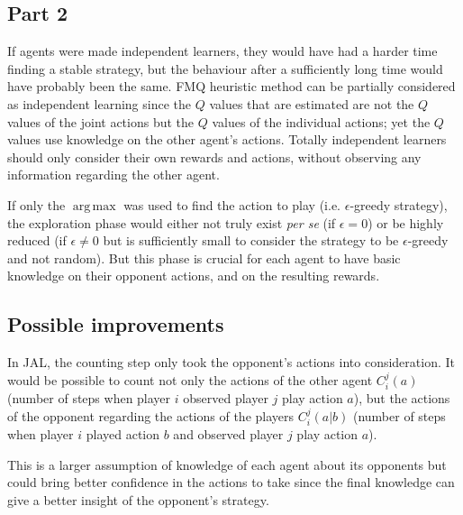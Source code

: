 \documentclass{article}
\DeclareMathOperator*{\argmax}{arg\,max}
\begin{document}
\newpage
\subsection{Part 2}

If agents were made independent learners, they would have had a harder time finding a stable strategy, but the behaviour after
a sufficiently long time would have probably been the same. FMQ heuristic method can be partially considered as independent learning
since the $Q$ values that are estimated are not the $Q$ values of the joint actions but the $Q$ values of the individual actions; yet
the $Q$ values use knowledge on the other agent's actions. Totally independent learners should only consider their own rewards and
actions, without observing any information regarding the other agent.

If only the $\argmax$ was used to find the action to play (i.e. $\epsilon$-greedy strategy), the exploration phase would either not
truly exist \textit{per se} (if $\epsilon=0$) or be highly reduced (if $\epsilon\neq0$ but is sufficiently small to consider the strategy
to be $\epsilon$-greedy and not random). But this phase is crucial for each agent to have basic knowledge on their opponent actions,
and on the resulting rewards.

\subsection{Possible improvements}

In JAL, the counting step only took the opponent's actions into consideration. It would be possible to count not only the actions
of the other agent $C_i^j(a)$ (number of steps when player $i$ observed player $j$ play action $a$), but the actions of the opponent
regarding the actions of the players $C_i^j(a|b)$ (number of steps when player $i$ played action $b$ and observed player $j$ play action
$a$).

This is a larger assumption of knowledge of each agent about its opponents but could bring better confidence in the actions to take
since the final knowledge can give a better insight of the opponent's strategy.
\end{document}
